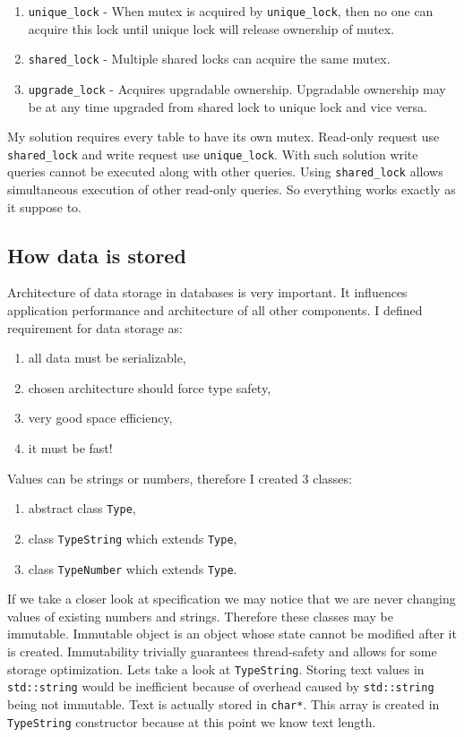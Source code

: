 \documentclass[10pt,a4paper]{article}
\begin{document}
\begin{enumerate}
\item \verb|unique_lock| - When mutex is acquired by \verb|unique_lock|, then no one can acquire this lock until unique lock will release ownership of mutex. 
\item \verb|shared_lock| - Multiple shared locks can acquire the same mutex.
\item \verb|upgrade_lock| - Acquires upgradable ownership. Upgradable ownership may be at any time upgraded from shared lock to unique lock and vice versa.
\end{enumerate}

My solution requires every table to have its own mutex. Read-only request use \verb|shared_lock| and write request use \verb|unique_lock|. With such solution write queries cannot be executed along with other queries. Using \verb|shared_lock| allows simultaneous execution of other read-only queries. So everything works exactly as it suppose to.

\subsection{How data is stored}

Architecture of data storage in databases is very important. It influences application performance and architecture of all other components. I defined requirement for data storage as: 
\begin{enumerate}
\item all data must be serializable,
\item chosen architecture should force type safety,
\item very good space efficiency,
\item it must be fast!
\end{enumerate}
Values can be strings or numbers, therefore I created 3 classes:
\begin{enumerate}
\item abstract class \verb|Type|,
\item class \verb|TypeString| which extends \verb|Type|,
\item class \verb|TypeNumber| which extends \verb|Type|.
\end{enumerate}

If we take a closer look at specification we may notice that we are never changing values of existing numbers and strings. Therefore these classes may be immutable. Immutable object is an object whose state cannot be modified after it is created. Immutability trivially guarantees thread-safety and allows for some storage optimization. Lets take a look at \verb|TypeString|. Storing text values in \verb|std::string| would be inefficient because of overhead caused by \verb|std::string| being not immutable. Text is actually stored in \verb|char*|. This array is created in \verb|TypeString| constructor because at this point we know text length.   
\end{document}
